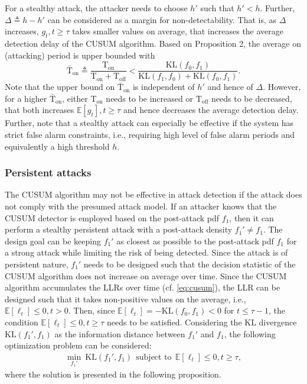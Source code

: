 \documentclass[onecolumn]{IEEEtran}
\begin{document}
For a stealthy attack, the attacker needs to choose $h'$ such that $h' < h$. Further, $\Delta \triangleq h - h'$ can be considered as a margin for non-detectability. That is, as $\Delta$ increases, $g_t, t \geq \tau$ takes smaller values on average, that increases the average detection delay of the CUSUM algorithm. Based on Proposition 2, the average on (attacking) period is upper bounded with
\begin{equation}\nonumber
\bar{\mathrm{T}}_{\text{on}} \triangleq \frac{\mathrm{T}_{\text{on}}}{\mathrm{T}_{\text{on}} + \mathrm{T}_{\text{off}}} <
\frac{\mathrm{KL}(f_0,f_1)}{\mathrm{KL}(f_1,f_0) + \mathrm{KL}(f_0,f_1)}.
\end{equation}
Note that the upper bound on $\bar{\mathrm{T}}_{\text{on}}$ is independent of $h'$ and hence of $\Delta$. However, for a higher $\bar{\mathrm{T}}_{\text{on}}$, either $\mathrm{T}_{\text{on}}$ needs to be increased or $\mathrm{T}_{\text{off}}$ needs to be decreased, that both increases $\mathbb{E}[g_t], t \geq \tau$ and hence decreases the average detection delay. Further, note that a stealthy attack can especially be effective if the system has strict false alarm constraints, i.e., requiring high level of false alarm periods and equivalently a high threshold $h$.

\subsubsection{Persistent attacks}

The CUSUM algorithm may not be effective in attack detection if the attack does not comply with the presumed attack model. If an attacker knows that the CUSUM detector is employed based on the post-attack pdf $f_1$, then it can perform a stealthy persistent attack with a post-attack density $f_1' \neq f_1$. The design goal can be keeping $f_1'$ as closest as possible to the post-attack pdf $f_1$ for a strong attack while limiting the risk of being detected. Since the attack is of persistent nature, $f_1'$ needs to be designed such that the decision statistic of the CUSUM algorithm does not increase on average over time. Since the CUSUM algorithm accumulates the LLRs over time (cf. \eqref{eq:cusum}), the LLR can be designed such that it takes non-positive values on the average, i.e., $\mathbb{E}[\ell_t] \leq 0, t > 0$. Then, since $\mathbb{E}[\ell_t] = -\mathrm{KL}(f_0,f_1) < 0$ for $t \leq \tau - 1$, the condition $\mathbb{E}[\ell_t] \leq 0, t \geq \tau$ needs to be satisfied. Considering the KL divergence $\mathrm{KL}(f_1',f_1)$ as the information distance between $f_1'$ and $f_1$, the following optimization problem can be considered:
\begin{align} \label{eq:opt_prob_stealth}
\min_{f_1'} ~ \mathrm{KL}(f_1',f_1) ~~ \text{subject to} ~~ \mathbb{E}[\ell_t] \leq 0, t \geq \tau,
\end{align}
where the solution is presented in the following proposition.
\end{document}
